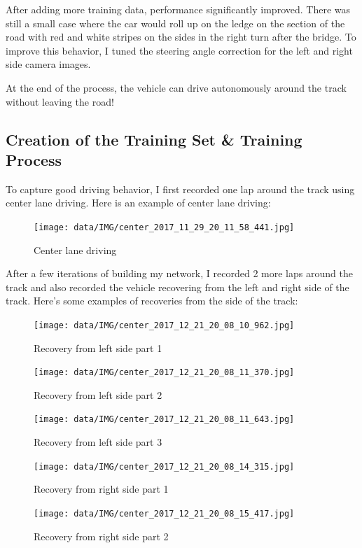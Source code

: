 \documentclass[12pt]{article}
\begin{document}
After adding more training data, performance significantly improved. There was still a small case where the car would roll up on the ledge on the section of the road with red and white stripes on the sides in the right turn after the bridge. To improve this behavior, I tuned the steering angle correction for the left and right side camera images. 

At the end of the process, the vehicle can drive autonomously around the track without leaving the road!

\subsection{Creation of the Training Set \& Training Process}
To capture good driving behavior, I first recorded one lap around the track using center lane driving. Here is an example of center lane driving:
\begin{figure}[h]
\centering
\texttt{[image: data/IMG/center\_2017\_11\_29\_20\_11\_58\_441.jpg]}
\caption{Center lane driving}
\end{figure}
\vspace{50mm}

After a few iterations of building my network, I recorded 2 more laps around the track and also recorded the vehicle recovering from the left and right side of the track. Here's some examples of recoveries from the side of the track:
\begin{figure}[!h]
\centering
\texttt{[image: data/IMG/center\_2017\_12\_21\_20\_08\_10\_962.jpg]}
\caption{Recovery from left side part 1}
\end{figure}

\begin{figure}[H]
\centering
\texttt{[image: data/IMG/center\_2017\_12\_21\_20\_08\_11\_370.jpg]}
\caption{Recovery from left side part 2}
\end{figure}

\begin{figure}[h]
\centering
\texttt{[image: data/IMG/center\_2017\_12\_21\_20\_08\_11\_643.jpg]}
\caption{Recovery from left side part 3}
\end{figure}

\begin{figure}[!h]
\centering
\texttt{[image: data/IMG/center\_2017\_12\_21\_20\_08\_14\_315.jpg]}
\caption{Recovery from right side part 1}
\end{figure}

\begin{figure}[H]
\centering
\texttt{[image: data/IMG/center\_2017\_12\_21\_20\_08\_15\_417.jpg]}
\caption{Recovery from right side part 2}
\end{figure}
\vspace{50mm}
\end{document}
